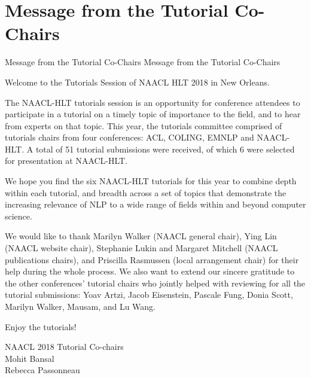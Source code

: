 \section{Message from the Tutorial Co-Chairs}\vspace{2em}
\setheaders%
    {Message from the Tutorial Co-Chairs}%
    {Message from the Tutorial Co-Chairs}
\thispagestyle{emptyheader}

\setlength{\parskip}{1ex}

Welcome to the Tutorials Session of NAACL HLT 2018 in New Orleans.

The NAACL-HLT tutorials session is an opportunity for conference attendees to participate in a tutorial on a timely topic of importance to the field, and to hear from experts on that topic. This year, the tutorials committee comprised of tutorials chairs from four conferences: ACL, COLING, EMNLP and NAACL-HLT. A total of 51 tutorial submissions were received, of which 6 were selected for presentation at NAACL-HLT.

We hope you find the six NAACL-HLT tutorials for this year to combine depth within each tutorial, and breadth across a set of topics that demonstrate the increasing relevance of NLP to a wide range of fields within and beyond computer science.

We would like to thank Marilyn Walker (NAACL general chair), Ying Lin (NAACL website chair), Stephanie Lukin and Margaret Mitchell (NAACL publications chairs), and Priscilla Rasmussen (local arrangement chair) for their help during the whole process. We also want to extend our sincere gratitude to the other conferences' tutorial chairs who jointly helped with reviewing for all the tutorial submissions: Yoav Artzi, Jacob Eisenstein, Pascale Fung, 
Donia Scott, Marilyn Walker, Mausam, and Lu Wang.

Enjoy the tutorials!

\vskip 0.5in
\noindent
NAACL 2018 Tutorial Co-chairs\\
\noindent
Mohit Bansal \\
\noindent
Rebecca Passonneau\\

